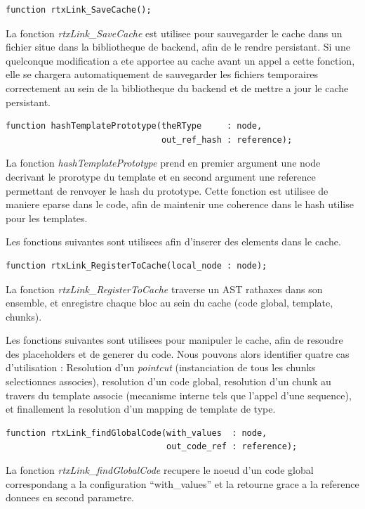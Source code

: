\documentclass[french]{rtxreport}
\begin{document}
\begin{enumerate}
\begin{lstlisting}
function rtxLink_SaveCache();
\end{lstlisting}
La fonction \emph{rtxLink\_SaveCache} est utilisee pour sauvegarder le cache
dans un fichier situe dans la bibliotheque de backend, afin de le rendre
persistant. Si une quelconque modification a ete apportee au cache avant un
appel a cette fonction, elle se chargera automatiquement de sauvegarder les
fichiers temporaires correctement au sein de la bibliotheque du backend et de
mettre a jour le cache persistant.

\begin{lstlisting}
function hashTemplatePrototype(theRType     : node,
                               out_ref_hash : reference);
\end{lstlisting}
La fonction \emph{hashTemplatePrototype} prend en premier argument une node
decrivant le prorotype du template et en second argument une reference
permettant de renvoyer le hash du prototype. Cette fonction est utilisee de
maniere eparse dans le code, afin de maintenir une coherence dans le hash
utilise pour les templates.

\vspace{}

Les fonctions suivantes sont utilisees afin d'inserer des elements dans le
cache.

\begin{lstlisting}
function rtxLink_RegisterToCache(local_node : node);
\end{lstlisting}
La fonction \emph{rtxLink\_RegisterToCache} traverse un AST rathaxes dans son
ensemble, et enregistre chaque bloc au sein du cache (code global, template,
chunks).

\vspace{}

Les fonctions suivantes sont utilisees pour manipuler le cache, afin de
resoudre des placeholders et de generer du code. Nous pouvons alors identifier
quatre cas d'utilisation : Resolution d'un \emph{pointcut} (instanciation de
tous les chunks selectionnes associes), resolution d'un code global, resolution
d'un chunk au travers du template associe (mecanisme interne tels que l'appel
d'une sequence), et finallement la resolution d'un mapping de template de type.

\begin{lstlisting}
function rtxLink_findGlobalCode(with_values  : node,
                                out_code_ref : reference);
\end{lstlisting}
La fonction \emph{rtxLink\_findGlobalCode} recupere le noeud d'un code global
correspondang a la configuration ``with\_values'' et la retourne grace a la
reference donnees en second parametre.


\end{enumerate}
\end{document}
